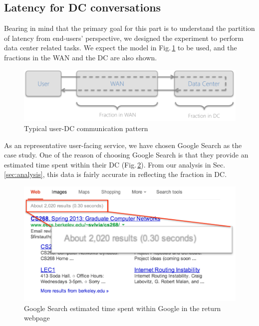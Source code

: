 \subsection{Latency for DC conversations}
\label{sec:latency-dc-conv}
Bearing in mind that the primary goal for this part is to understand the partition of latency from end-users' perspective, we designed the experiment to perform data center related tasks. We expect the model in Fig.\,\ref{fig:DC_model} to be used, and the fractions in the WAN and the DC are also shown. 

\begin{figure}
  \centering
  \includegraphics[width=\linewidth]{../figs/DC_model.pdf}
  \caption{Typical user-DC communication pattern}
  \label{fig:DC_model}
\end{figure}

As an representative user-facing service, we have chosen Google Search as the case study. One of the reason of choosing Google Search is that they provide an estimated time spent within their DC (Fig.\,\ref{fig:google_time}). From our analysis in Sec.\,\ref{sec:analysis}, this data is fairly accurate in reflecting the fraction in DC. 

\begin{figure}
  \centering
  \includegraphics[width=0.85\linewidth]{../figs/GoogleTime.pdf}
  \caption{Google Search estimated time spent within Google in the return webpage}
  \label{fig:google_time}
\end{figure}

